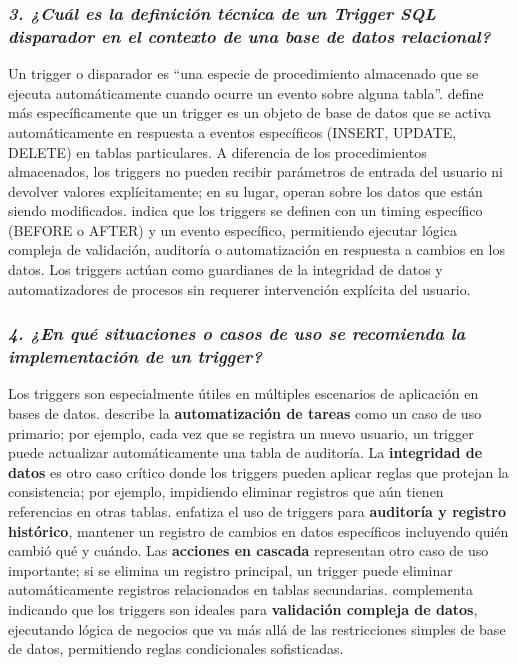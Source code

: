 \subsubsection*{\textit{3. ¿Cuál es la definición técnica de un Trigger SQL disparador en el contexto de una base de datos relacional?}}

Un trigger o disparador es \parencite{Bosco2020} ``una especie de procedimiento almacenado que se ejecuta automáticamente cuando ocurre un evento sobre alguna tabla''. \parencite{Walther2023} define más específicamente que un trigger es un objeto de base de datos que se activa automáticamente en respuesta a eventos específicos (INSERT, UPDATE, DELETE) en tablas particulares. A diferencia de los procedimientos almacenados, los triggers no pueden recibir parámetros de entrada del usuario ni devolver valores explícitamente; en su lugar, operan sobre los datos que están siendo modificados. \parencite{MySQLDocumentation} indica que los triggers se definen con un timing específico (BEFORE o AFTER) y un evento específico, permitiendo ejecutar lógica compleja de validación, auditoría o automatización en respuesta a cambios en los datos. Los triggers actúan como guardianes de la integridad de datos y automatizadores de procesos sin requerer intervención explícita del usuario.

\subsubsection*{\textit{4. ¿En qué situaciones o casos de uso se recomienda la implementación de un trigger?}}

Los triggers son especialmente útiles en múltiples escenarios de aplicación en bases de datos. \parencite{Walther2023} describe la \textbf{automatización de tareas} como un caso de uso primario; por ejemplo, cada vez que se registra un nuevo usuario, un trigger puede actualizar automáticamente una tabla de auditoría. La \textbf{integridad de datos} es otro caso crítico donde los triggers pueden aplicar reglas que protejan la consistencia; por ejemplo, impidiendo eliminar registros que aún tienen referencias en otras tablas. \parencite{Bosco2020} enfatiza el uso de triggers para \textbf{auditoría y registro histórico}, mantener un registro de cambios en datos específicos incluyendo quién cambió qué y cuándo. Las \textbf{acciones en cascada} representan otro caso de uso importante; si se elimina un registro principal, un trigger puede eliminar automáticamente registros relacionados en tablas secundarias. \parencite{Base100} complementa indicando que los triggers son ideales para \textbf{validación compleja de datos}, ejecutando lógica de negocios que va más allá de las restricciones simples de base de datos, permitiendo reglas condicionales sofisticadas.

